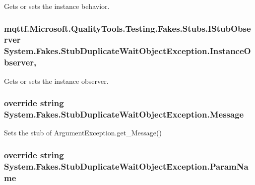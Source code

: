 Gets or sets the instance behavior.

\hypertarget{class_system_1_1_fakes_1_1_stub_duplicate_wait_object_exception_a79a849b04f7b19ed7fd31a861045c971}{
\subsubsection[{Instance\-Observer}]{\setlength{\rightskip}{0pt plus 5cm}mqttf.\-Microsoft.\-Quality\-Tools.\-Testing.\-Fakes.\-Stubs.\-I\-Stub\-Observer System.\-Fakes.\-Stub\-Duplicate\-Wait\-Object\-Exception.\-Instance\-Observer\hspace{0.3cm}{\ttfamily [get]}, {\ttfamily [set]}}}\label{class_system_1_1_fakes_1_1_stub_duplicate_wait_object_exception_a79a849b04f7b19ed7fd31a861045c971}


Gets or sets the instance observer.

\hypertarget{class_system_1_1_fakes_1_1_stub_duplicate_wait_object_exception_a11271dea6203eaaac76b059ff5495c41}{
\subsubsection[{Message}]{\setlength{\rightskip}{0pt plus 5cm}override string System.\-Fakes.\-Stub\-Duplicate\-Wait\-Object\-Exception.\-Message\hspace{0.3cm}{\ttfamily [get]}}}\label{class_system_1_1_fakes_1_1_stub_duplicate_wait_object_exception_a11271dea6203eaaac76b059ff5495c41}


Sets the stub of Argument\-Exception.\-get\-\_\-\-Message()

\hypertarget{class_system_1_1_fakes_1_1_stub_duplicate_wait_object_exception_a690033cf8a2978dd62f583a144547a70}{
\subsubsection[{Param\-Name}]{\setlength{\rightskip}{0pt plus 5cm}override string System.\-Fakes.\-Stub\-Duplicate\-Wait\-Object\-Exception.\-Param\-Name\hspace{0.3cm}{\ttfamily [get]}}}\label{class_system_1_1_fakes_1_1_stub_duplicate_wait_object_exception_a690033cf8a2978dd62f583a144547a70}


